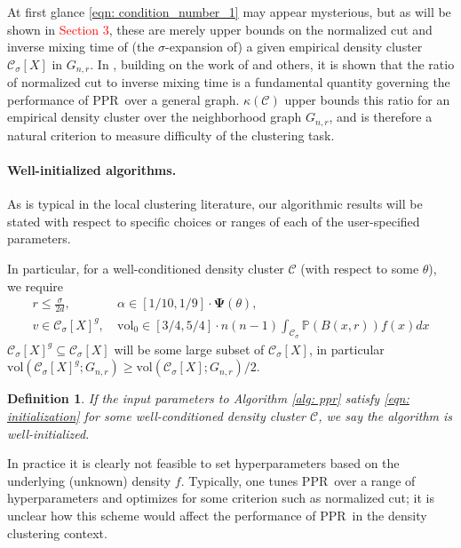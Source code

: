 \documentclass{article}
\newcommand{\vol}{\mathrm{vol}}
\newcommand{\1}{\mathbf{1}}
\newcommand{\Psibf}{\mathbf{\Psi}}
\newcommand{\Xbf}{X}             %
\newcommand{\Pbb}{\mathbb{P}}
\newcommand{\Cset}{\mathcal{C}}
\newcommand{\Csig}{\Cset_{\sigma}}
\newcommand{\pprspace}{{\sc PPR~}}
\theoremstyle{aldenthm}
\newtheorem{definition}{Definition}
\theoremstyle{aldenrmrk}
\begin{document}
At first glance \eqref{eqn: condition_number_1} may appear mysterious, but as will be shown in \textcolor{red}{Section 3}, these are merely upper bounds on the normalized cut and inverse mixing time of (the $\sigma$-expansion of) a given empirical density cluster $\Csig[\Xbf]$ in $G_{n,r}$. In \cite{zhu2013}, building on the work of \cite{andersen2006} and others, it is shown that the ratio of normalized cut to inverse mixing time is a fundamental quantity governing the performance of \pprspace over a general graph. $\kappa(\Cset)$ upper bounds this ratio for an empirical density cluster over the neighborhood graph $G_{n,r}$, and is therefore a natural criterion to measure difficulty of the clustering task.

\paragraph{Well-initialized algorithms.}

As is typical in the local clustering literature, our algorithmic results will be stated with respect to specific choices or ranges of each of the user-specified parameters.

In particular, for a well-conditioned density cluster $\Cset$ (with respect to some $\theta$), we require
\begin{align}
\label{eqn: initialization}
r \leq \frac{\sigma}{2d}, & ~\alpha \in [1/10, 1/9] \cdot \Psibf(\theta) \nonumber,  \\
v \in \Csig[\Xbf]^g, & ~\vol_0 \in [3/4,5/4] \cdot n(n-1) \int_{\Csig} \Pbb(B(x,r)) f(x) dx
\end{align}
$\Csig[\Xbf]^g \subseteq \Csig[\Xbf]$ will be some large subset of $\Csig[\Xbf]$, in particular $\vol(\Csig[\Xbf]^g; G_{n,r}) \geq \vol(\Csig[\Xbf]; G_{n,r})/2$.

\begin{definition}
	If the input parameters to Algorithm \ref{alg: ppr} satisfy \eqref{eqn: initialization} for some well-conditioned density cluster $\Cset$, we say the algorithm is \emph{well-initialized}.
\end{definition}

In practice it is clearly not feasible to set hyperparameters based on the underlying (unknown) density $f$. Typically, one tunes \pprspace over a range of hyperparameters and optimizes for some criterion such as normalized cut; it is unclear how this scheme would affect the performance of \pprspace in the density clustering context.
\end{document}
